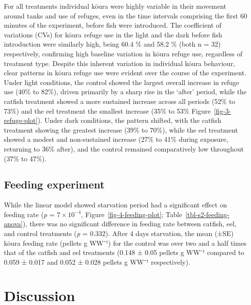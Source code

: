 \documentclass[
  letterpaper,
  DIV=11,
  numbers=noendperiod]{scrartcl}
\begin{document}
For all treatments individual kōura were highly variable in their
movement around tanks and use of refuges, even in the time intervals
comprising the first 60 minutes of the experiment, before fish were
introduced. The coefficient of variations (CVs) for kōura refuge use in
the light and the dark before fish introduction were similarly high,
being 60.4 \% and 58.2 \% (both n = 32) respectively, confirming high
baseline variation in kōura refuge use, regardless of treatment type.
Despite this inherent variation in individual kōura behaviour, clear
patterns in kōura refuge use were evident over the course of the
experiment. Under light conditions, the control showed the largest
overall increase in refuge use (40\% to 82\%), driven primarily by a
sharp rise in the `after' period, while the catfish treatment showed a
more sustained increase across all periods (52\% to 73\%) and the eel
treatment the smallest increase (35\% to 53\%
Figure~\ref{fig-3-refuge-plot}). Under dark conditions, the pattern
shifted, with the catfish treatment showing the greatest increase (39\%
to 70\%), while the eel treatment showed a modest and non-sustained
increase (27\% to 41\% during exposure, returning to 36\% after), and
the control remained comparatively low throughout (37\% to 47\%).

\subsection{Feeding experiment}\label{feeding-experiment-1}

While the linear model showed starvation period had a significant effect
on feeding rate (\emph{p} = \ensuremath{7\times 10^{-4}},
Figure~\ref{fig-4-feeding-plot}; Table~\ref{tbl-s2-feeding-anova}),
there was no significant difference in feeding rate between catfish,
eel, and control treatments (\emph{p} = 0.332). After 4 days starvation,
the mean (±SE) kōura feeding rate (pellets g WW⁻¹) for the control was
over two and a half times that of the catfish and eel treatments (0.148
± 0.05 pellets g WW⁻¹ compared to 0.059 ± 0.017 and 0.052 ± 0.028
pellets g WW⁻¹ respectively).

\section{Discussion}\label{discussion}
\end{document}

